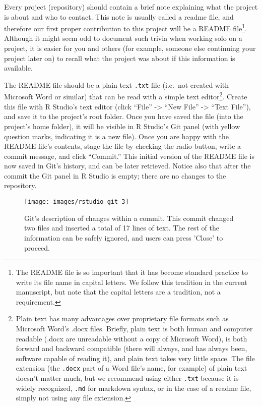\documentclass[
  american,
  ,doc,floatsintext]{apa6}
\begin{document}
Every project (repository) should contain a brief note explaining what the project is about and who to contact. This note is usually called a readme file, and therefore our first proper contribution to this project will be a README file\footnote{The README file is so important that it has become standard practice to write its file name in capital letters. We follow this tradition in the current manuscript, but note that the capital letters are a tradition, not a requirement.}. Although it might seem odd to document such trivia when working solo on a project, it is easier for you and others (for example, someone else continuing your project later on) to recall what the project was about if this information is available.

The README file should be a plain text \texttt{.txt} file (i.e.~not created with Microsoft Word or similar) that can be read with a simple text editor\footnote{Plain text has many advantages over proprietary file formats such as Microsoft Word's .docx files. Briefly, plain text is both human and computer readable (.docx are unreadable without a copy of Microsoft Word), is both forward and backward compatible (there will always, and has always been, software capable of reading it), and plain text takes very little space. The file extension (the \texttt{.docx} part of a Word file's name, for example) of plain text doesn't matter much, but we recommend using either \texttt{.txt} because it is widely recognized, \texttt{.md} for markdown syntax, or in the case of a readme file, simply not using any file extension.}. Create this file with R Studio's text editor (click ``File'' -\textgreater{} ``New File'' -\textgreater{} ``Text File''), and save it to the project's root folder. Once you have saved the file (into the project's home folder), it will be visible in R Studio's Git panel (with yellow question marks, indicating it is a new file). Once you are happy with the README file's contents, stage the file by checking the radio button, write a commit message, and click ``Commit.'' This initial version of the README file is now saved in Git's history, and can be later retrieved. Notice also that after the commit the Git panel in R Studio is empty; there are no changes to the repository.

\begin{figure}

{\centering \texttt{[image: images/rstudio-git-3]} 

}

\caption{Git's description of changes within a commit. This commit changed two files and inserted a total of 17 lines of text. The rest of the information can be safely ignored, and users can press 'Close' to proceed.}\label{fig:rstudio-git-3}
\end{figure}
\end{document}
